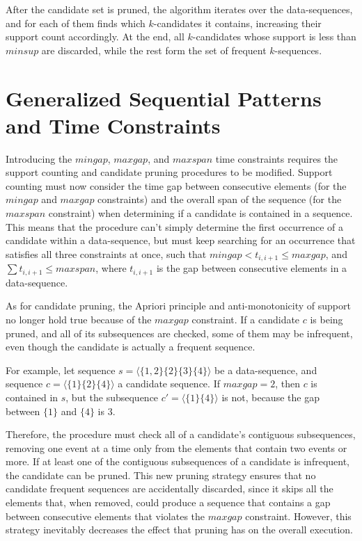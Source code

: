 After the candidate set is pruned, the algorithm iterates over the data-sequences, and for each of them finds which $k$-candidates it contains, increasing their support count accordingly. At the end, all $k$-candidates whose support is less than $minsup$ are discarded, while the rest form the set of frequent $k$-sequences.

\section{Generalized Sequential Patterns and Time Constraints}

Introducing the $mingap$, $maxgap$, and $maxspan$ time constraints requires the support counting and candidate pruning procedures to be modified. Support counting must now consider the time gap between consecutive elements (for the $mingap$ and $maxgap$ constraints) and the overall span of the sequence (for the $maxspan$ constraint) when determining if a candidate is contained in a sequence. This means that the procedure can't simply determine the first occurrence of a candidate within a data-sequence, but must keep searching for an occurrence that satisfies all three constraints at once, such that $mingap < t_{i,i+1} \leq maxgap$, and $\sum t_{i,i+1} \leq maxspan$, where $t_{i,i+1}$ is the gap between consecutive elements in a data-sequence.

As for candidate pruning, the Apriori principle and anti-monotonicity of support no longer hold true because of the $maxgap$ constraint. If a candidate $c$ is being pruned, and all of its subsequences are checked, some of them may be infrequent, even though the candidate is actually a frequent sequence.

For example, let sequence $s = \langle \{1, 2\} \{2\} \{3\} \{4\} \rangle$ be a data-sequence, and sequence $c = \langle \{1\} \{2\} \{4\} \rangle$ a candidate sequence. If $maxgap = 2$, then $c$ is contained in $s$, but the subsequence $c' = \langle \{1\} \{4\} \rangle$ is not, because the gap between $\{1\}$ and $\{4\}$ is $3$.

Therefore, the procedure must check all of a candidate's contiguous subsequences, removing one event at a time only from the elements that contain two events or more. If at least one of the contiguous subsequences of a candidate is infrequent, the candidate can be pruned. This new pruning strategy ensures that no candidate frequent sequences are accidentally discarded, since it skips all the elements that, when removed, could produce a sequence that contains a gap between consecutive elements that violates the $maxgap$ constraint. However, this strategy inevitably decreases the effect that pruning has on the overall execution.